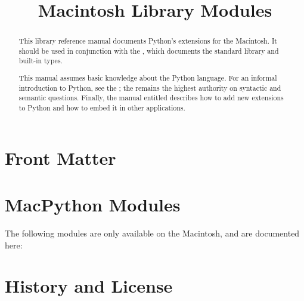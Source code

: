 \documentclass{manual}
\title{Macintosh Library Modules}
\begin{document}
\maketitle

\ifhtml
\chapter*{Front Matter\label{front}}
\fi



\begin{abstract}

\noindent
This library reference manual documents Python's extensions for the
Macintosh.  It should be used in conjunction with the
, which documents
the standard library and built-in types.

This manual assumes basic knowledge about the Python language.  For an
informal introduction to Python, see the
; the
 remains the
highest authority on syntactic and semantic questions.  Finally, the
manual entitled  describes how to add new extensions to Python
and how to embed it in other applications.

\end{abstract}

\tableofcontents




\chapter{MacPython Modules \label{macpython-modules}}

The following modules are only available on the Macintosh, and are
documented here:

\localmoduletable















\appendix
\chapter{History and License}


%
%

\renewcommand{\indexname}{Module Index}

\renewcommand{\indexname}{Index}
\end{document}
